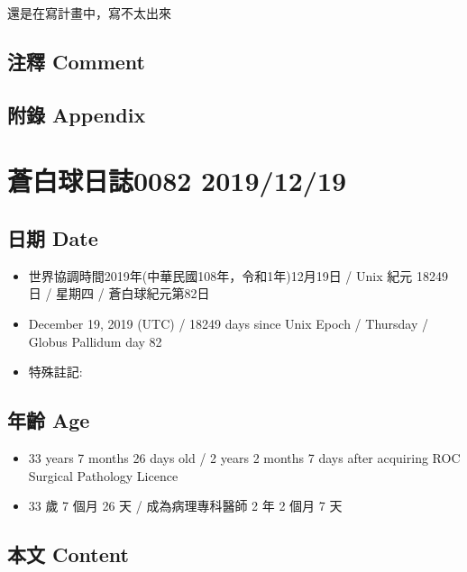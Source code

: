 \documentclass[
]{article}
\providecommand{\tightlist}{%
  \setlength{\itemsep}{0pt}\setlength{\parskip}{0pt}}
\begin{document}
還是在寫計畫中，寫不太出來

\hypertarget{ux6ce8ux91cb-comment-16}{%
\subsection{注釋 Comment}\label{ux6ce8ux91cb-comment-16}}

\hypertarget{ux9644ux9304-appendix-17}{%
\subsection{附錄 Appendix}\label{ux9644ux9304-appendix-17}}

\hypertarget{ux84bcux767dux7403ux65e5ux8a8c0082-20191219}{%
\section{蒼白球日誌0082
2019/12/19}\label{ux84bcux767dux7403ux65e5ux8a8c0082-20191219}}

\hypertarget{ux65e5ux671f-date-18}{%
\subsection{日期 Date}\label{ux65e5ux671f-date-18}}

\begin{itemize}
\tightlist
\item
  世界協調時間2019年(中華民國108年，令和1年)12月19日 / Unix 紀元 18249
  日 / 星期四 / 蒼白球紀元第82日
\item
  December 19, 2019 (UTC) / 18249 days since Unix Epoch / Thursday /
  Globus Pallidum day 82
\item
  特殊註記:
\end{itemize}

\hypertarget{ux5e74ux9f61-age-18}{%
\subsection{年齡 Age}\label{ux5e74ux9f61-age-18}}

\begin{itemize}
\tightlist
\item
  33 years 7 months 26 days old / 2 years 2 months 7 days after
  acquiring ROC Surgical Pathology Licence
\item
  33 歲 7 個月 26 天 / 成為病理專科醫師 2 年 2 個月 7 天
\end{itemize}

\hypertarget{ux672cux6587-content-18}{%
\subsection{本文 Content}\label{ux672cux6587-content-18}}
\end{document}

